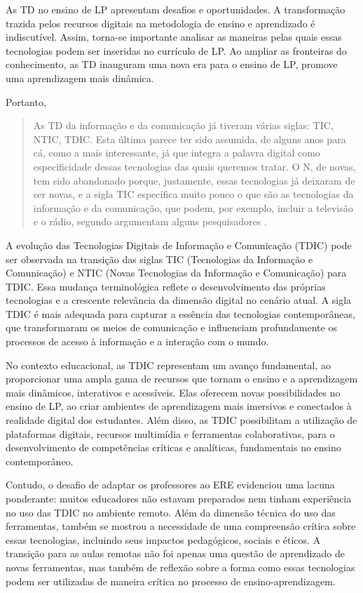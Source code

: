 \documentclass[portuguese]{textolivre}
\begin{document}
As TD no ensino de LP apresentam desafios e oportunidades. A transformação trazida pelos recursos digitais na metodologia de ensino e aprendizado é indiscutível. Assim, torna-se importante analisar as maneiras pelas quais essas tecnologias podem ser inseridas no currículo de LP. Ao ampliar as fronteiras do conhecimento, as TD inauguram uma nova era para o ensino de LP, promove uma aprendizagem mais dinâmica.

Portanto,

\begin{quote}
    As TD da informação e da comunicação já tiveram várias siglas: TIC, NTIC, TDIC. Esta última parece ter sido assumida, de alguns anos para cá, como a mais interessante, já que integra a palavra digital como especificidade dessas tecnologias das quais queremos tratar. O N, de novas, tem sido abandonado porque, justamente, essas tecnologias já deixaram de ser novas, e a sigla TIC específica muito pouco o que são as tecnologias da informação e da comunicação, que podem, por exemplo, incluir a televisão e o rádio, segundo argumentam alguns pesquisadores \cite[p. 55]{ribeiro2023linguistica}.
\end{quote}

A evolução das Tecnologias Digitais de Informação e Comunicação (TDIC) pode ser observada na transição das siglas TIC (Tecnologias da Informação e Comunicação) e NTIC (Novas Tecnologias da Informação e Comunicação) para TDIC. Essa mudança terminológica reflete o desenvolvimento das próprias tecnologias e a crescente relevância da dimensão digital no cenário atual. A sigla TDIC é mais adequada para capturar a essência das tecnologias contemporâneas, que transformaram os meios de comunicação e influenciam profundamente os processos de acesso à informação e a interação com o mundo.

No contexto educacional, as TDIC representam um avanço fundamental, ao proporcionar uma ampla gama de recursos que tornam o ensino e a aprendizagem mais dinâmicos, interativos e acessíveis. Elas oferecem novas possibilidades no ensino de LP, ao criar ambientes de aprendizagem mais imersivos e conectados à realidade digital dos estudantes. Além disso, as TDIC possibilitam a utilização de plataformas digitais, recursos multimídia e ferramentas colaborativas, para o desenvolvimento de competências críticas e analíticas, fundamentais no ensino contemporâneo.

Contudo, o desafio de adaptar os professores ao ERE evidenciou uma lacuna ponderante: muitos educadores não estavam preparados nem tinham experiência no uso das TDIC no ambiente remoto. Além da dimensão técnica do uso das ferramentas, também se mostrou a necessidade de uma compreensão crítica sobre essas tecnologias, incluindo seus impactos pedagógicos, sociais e éticos. A transição para as aulas remotas não foi apenas uma questão de aprendizado de novas ferramentas, mas também de reflexão sobre a forma como essas tecnologias podem ser utilizadas de maneira crítica no processo de ensino-aprendizagem.
\end{document}
